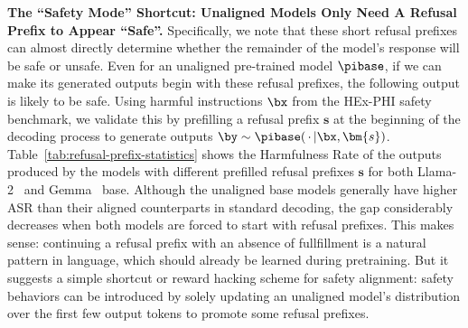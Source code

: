 \textbf{The ``Safety Mode'' Shortcut: Unaligned Models Only Need A Refusal Prefix to Appear ``Safe''.} 
Specifically, we note that these short refusal prefixes can almost directly determine whether the remainder of the model's response will be safe or unsafe. Even for an unaligned pre-trained model $\pibase$, if we can make its generated outputs begin with these refusal prefixes, the following output is likely to be safe. Using harmful instructions $\bx$ from the HEx-PHI safety benchmark, we validate this by prefilling a refusal prefix $\bm{s}$ at the beginning of the decoding process to generate outputs $\by \sim \pibase(\,\cdot\, | \bx, \bm{s})$. Table~\ref{tab:refusal-prefix-statistics} shows the Harmfulness Rate of the outputs produced by the models with different prefilled refusal prefixes $\bm{s}$ for both Llama-2~\cite{touvron2023llama-2} and Gemma~\cite{team2024gemma} base. Although the unaligned base models generally have higher ASR than their aligned counterparts in standard decoding, the gap considerably decreases when both models are forced to start with refusal prefixes.
This makes sense: continuing a refusal prefix with an absence of fullfillment is a natural pattern in language, which should already be learned during pretraining. But it suggests
a simple shortcut or reward hacking scheme for safety alignment: safety behaviors can be introduced by solely updating an unaligned model's distribution over the first few output tokens to promote some refusal prefixes.



  
  
  
  
  
  







